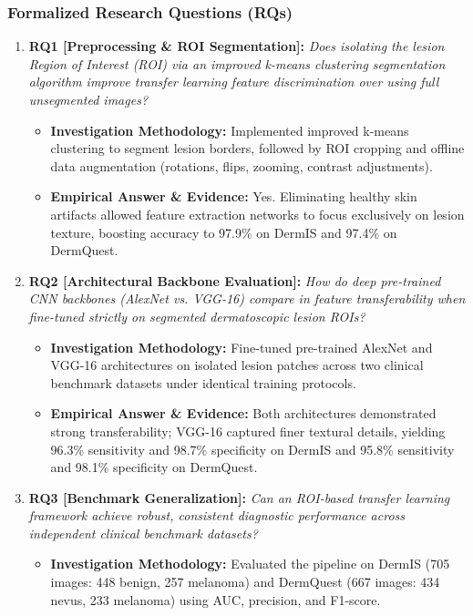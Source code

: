 \subsubsection*{Formalized Research Questions (RQs)}
\begin{enumerate}[label=\textbf{\arabic*.}, leftmargin=*]
  \item \textbf{RQ1 [Preprocessing \& ROI Segmentation]:} \textit{Does isolating the lesion Region of Interest (ROI) via an improved k-means clustering segmentation algorithm improve transfer learning feature discrimination over using full unsegmented images?}
  \begin{itemize}[leftmargin=1.5em]
    \item \textbf{Investigation Methodology:} Implemented improved k-means clustering to segment lesion borders, followed by ROI cropping and offline data augmentation (rotations, flips, zooming, contrast adjustments).
    \item \textbf{Empirical Answer \& Evidence:} Yes. Eliminating healthy skin artifacts allowed feature extraction networks to focus exclusively on lesion texture, boosting accuracy to 97.9\% on DermIS and 97.4\% on DermQuest.
  \end{itemize}
  \item \textbf{RQ2 [Architectural Backbone Evaluation]:} \textit{How do deep pre-trained CNN backbones (AlexNet vs. VGG-16) compare in feature transferability when fine-tuned strictly on segmented dermatoscopic lesion ROIs?}
  \begin{itemize}[leftmargin=1.5em]
    \item \textbf{Investigation Methodology:} Fine-tuned pre-trained AlexNet and VGG-16 architectures on isolated lesion patches across two clinical benchmark datasets under identical training protocols.
    \item \textbf{Empirical Answer \& Evidence:} Both architectures demonstrated strong transferability; VGG-16 captured finer textural details, yielding 96.3\% sensitivity and 98.7\% specificity on DermIS and 95.8\% sensitivity and 98.1\% specificity on DermQuest.
  \end{itemize}
  \item \textbf{RQ3 [Benchmark Generalization]:} \textit{Can an ROI-based transfer learning framework achieve robust, consistent diagnostic performance across independent clinical benchmark datasets?}
  \begin{itemize}[leftmargin=1.5em]
    \item \textbf{Investigation Methodology:} Evaluated the pipeline on DermIS (705 images: 448 benign, 257 melanoma) and DermQuest (667 images: 434 nevus, 233 melanoma) using AUC, precision, and F1-score.

\end{itemize}
\end{enumerate}
